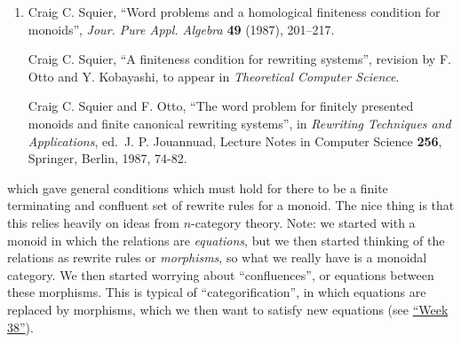 \documentclass{article}
\begin{document}
\begin{enumerate}
\def\labelenumi{\arabic{enumi})}
\setcounter{enumi}{5}
\item
  Craig C. Squier, ``Word problems and a homological finiteness
  condition for monoids'', \emph{Jour. Pure Appl. Algebra} \textbf{49}
  (1987), 201--217.

  Craig C. Squier, ``A finiteness condition for rewriting systems'',
  revision by F. Otto and Y. Kobayashi, to appear in \emph{Theoretical
  Computer Science}.

  Craig C. Squier and F. Otto, ``The word problem for finitely presented
  monoids and finite canonical rewriting systems'', in \emph{Rewriting
  Techniques and Applications}, ed.~J. P. Jouannuad, Lecture Notes in
  Computer Science \textbf{256}, Springer, Berlin, 1987, 74-82.
\end{enumerate}

which gave general conditions which must hold for there to be a finite
terminating and confluent set of rewrite rules for a monoid. The nice
thing is that this relies heavily on ideas from \(n\)-category theory.
Note: we started with a monoid in which the relations are
\emph{equations}, but we then started thinking of the relations as
rewrite rules or \emph{morphisms}, so what we really have is a monoidal
category. We then started worrying about ``confluences'', or equations
between these morphisms. This is typical of ``categorification'', in
which equations are replaced by morphisms, which we then want to satisfy
new equations (see \protect\hyperlink{week38}{``Week 38''}).
\end{document}
